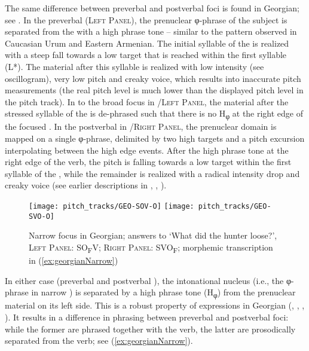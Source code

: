 \documentclass[output=paper,colorlinks,citecolor=brown]{langscibook}
\begin{document}
The same difference between preverbal and postverbal foci is found in Georgian; see . In the preverbal  (\textsc{Left Panel}), the prenuclear φ-phrase of the subject is separated from the  with a high phrase tone -- similar to the pattern observed in Caucasian Urum and Eastern Armenian. The initial syllable of the  is realized with a steep fall towards a low target that is reached within the first syllable (L*). The material after this syllable is realized with low intensity (see oscillogram), very low pitch and creaky voice, which results into inaccurate pitch measurements (the real pitch level is much lower than the displayed pitch level in the pitch track). In  to the broad focus in /\textsc{Left Panel}, the material after the stressed syllable of the  is de-phrased such that there is no H\textsubscript{φ} at the right edge of the focused . In the postverbal  in /\textsc{Right Panel}, the prenuclear domain is mapped on a single φ-phrase, delimited by two high targets and a pitch excursion interpolating between the high edge events. After the high phrase tone at the right edge of the verb, the pitch is falling towards a low target within the first syllable of the , while the remainder is realized with a radical intensity drop and creaky voice (see earlier descriptions in \citealt[177]{vicenik_autosegmental-metrical_2014}{}, \citealt[]{skopeteas_Fery_focus_2010}{}, \citealt[291]{borise_phrasing_2019}{}).

\begin{figure}
    \texttt{[image: pitch\_tracks/GEO-SOV-O]}
    \texttt{[image: pitch\_tracks/GEO-SVO-O]}
    \caption{Narrow focus in Georgian; answers to ‘What did the hunter loose?’, \textsc{Left Panel}: SO\textsubscript{F}V; \textsc{Right Panel}: SVO\textsubscript{F}; morphemic transcription in (\ref{ex:georgianNarrow})}
    \label{fig:georgianNarrow}
\end{figure}

In either case (preverbal and postverbal ), the intonational nucleus (i.e., the φ-phrase in narrow ) is separated by a high phrase tone (H\textsubscript{φ}) from the prenuclear material on its left side. This is a robust property of  expressions in Georgian (\citealt[]{skopeteas_Fery_focus_2010}, \citealt[711--713]{fery_focus_2013}{}, \citealt[]{borise_focus_2021}{}, \citealt[181]{vicenik_autosegmental-metrical_2014}{}). It results in a difference in phrasing between preverbal and postverbal foci: while the former are phrased together with the verb, the latter are prosodically separated from the verb; see (\ref{ex:georgianNarrow}).
\end{document}
